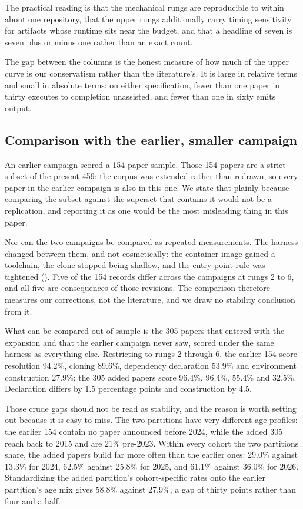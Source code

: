 The practical reading is that the mechanical rungs are reproducible to within
about one repository, that the upper rungs additionally carry timing sensitivity
for artifacts whose runtime sits near the budget, and that a headline of seven is
seven plus or minus one rather than an exact count.

The gap between the columns is the honest measure of how much of the upper curve
is our conservatism rather than the literature's. It is large in relative terms
and small in absolute terms: on either specification, fewer than one paper in
thirty executes to completion unassisted, and fewer than one in sixty emits
output.

\subsection{Comparison with the earlier, smaller campaign}\label{sec:replication}

An earlier campaign scored a 154-paper sample. Those 154 papers are a strict
subset of the present 459: the corpus was extended rather than redrawn, so every
paper in the earlier campaign is also in this one. We state that plainly because
comparing the subset against the superset that contains it would not be a
replication, and reporting it as one would be the most misleading thing in this
paper.

Nor can the two campaigns be compared as repeated measurements. The harness
changed between them, and not cosmetically: the container image gained a
toolchain, the clone stopped being shallow, and the entry-point rule was
tightened (). Five of the 154 records differ across the
campaigns at rungs 2 to 6, and all five are consequences of those revisions. The
comparison therefore measures our corrections, not the literature, and we draw no
stability conclusion from it.

What can be compared out of sample is the 305 papers that entered with the
expansion and that the earlier campaign never saw, scored under the same harness
as everything else. Restricting to rungs 2 through 6, the earlier 154 score
resolution 94.2\%, cloning 89.6\%, dependency declaration 53.9\% and environment
construction 27.9\%; the 305 added papers score 96.4\%, 96.4\%, 55.4\% and
32.5\%. Declaration differs by 1.5 percentage points and construction by 4.5.

Those crude gaps should not be read as stability, and the reason is worth setting
out because it is easy to miss. The two partitions have very different age
profiles: the earlier 154 contain no paper announced before 2024, while the added
305 reach back to 2015 and are 21\% pre-2023. Within every cohort the two
partitions share, the added papers build far more often than the earlier ones:
29.0\% against 13.3\% for 2024, 62.5\% against 25.8\% for 2025, and 61.1\%
against 36.0\% for 2026. Standardizing the added partition's cohort-specific
rates onto the earlier partition's age mix gives 58.8\% against 27.9\%, a gap of
thirty points rather than four and a half.

